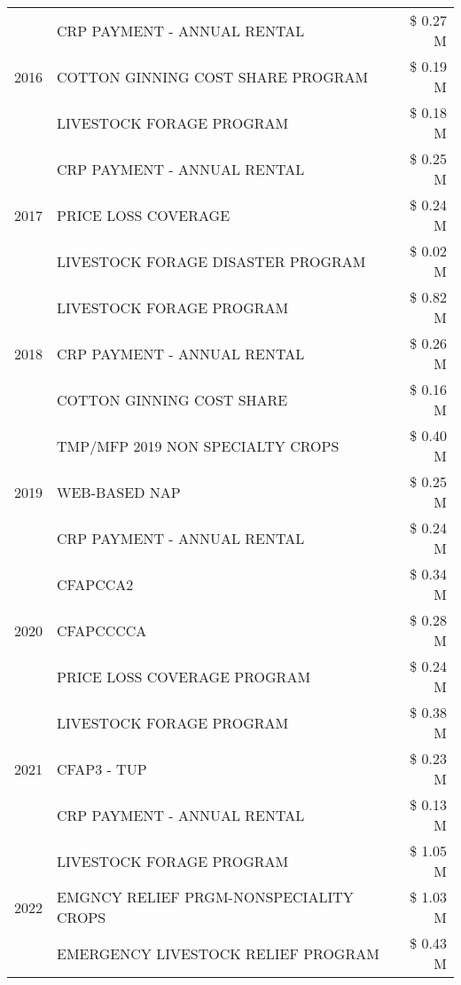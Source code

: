 \begin{tabular}{llr}
\cline{1-3}
\multirow[t]{3}{*}{2016} & CRP PAYMENT - ANNUAL RENTAL & \$ 0.27 M \\
 & COTTON GINNING COST SHARE PROGRAM & \$ 0.19 M \\
 & LIVESTOCK FORAGE PROGRAM & \$ 0.18 M \\
\cline{1-3}
\multirow[t]{3}{*}{2017} & CRP PAYMENT - ANNUAL RENTAL & \$ 0.25 M \\
 & PRICE LOSS COVERAGE & \$ 0.24 M \\
 & LIVESTOCK FORAGE DISASTER PROGRAM & \$ 0.02 M \\
\cline{1-3}
\multirow[t]{3}{*}{2018} & LIVESTOCK FORAGE PROGRAM & \$ 0.82 M \\
 & CRP PAYMENT - ANNUAL RENTAL & \$ 0.26 M \\
 & COTTON GINNING COST SHARE & \$ 0.16 M \\
\cline{1-3}
\multirow[t]{3}{*}{2019} & TMP/MFP 2019 NON SPECIALTY CROPS & \$ 0.40 M \\
 & WEB-BASED NAP & \$ 0.25 M \\
 & CRP PAYMENT - ANNUAL RENTAL & \$ 0.24 M \\
\cline{1-3}
\multirow[t]{3}{*}{2020} & CFAPCCA2 & \$ 0.34 M \\
 & CFAPCCCCA & \$ 0.28 M \\
 & PRICE LOSS COVERAGE PROGRAM & \$ 0.24 M \\
\cline{1-3}
\multirow[t]{3}{*}{2021} & LIVESTOCK FORAGE PROGRAM & \$ 0.38 M \\
 & CFAP3 - TUP & \$ 0.23 M \\
 & CRP PAYMENT - ANNUAL RENTAL & \$ 0.13 M \\
\cline{1-3}
\multirow[t]{3}{*}{2022} & LIVESTOCK FORAGE PROGRAM & \$ 1.05 M \\
 & EMGNCY RELIEF PRGM-NONSPECIALITY CROPS & \$ 1.03 M \\
 & EMERGENCY LIVESTOCK RELIEF PROGRAM & \$ 0.43 M \\
\cline{1-3}
\bottomrule
\end{tabular}

